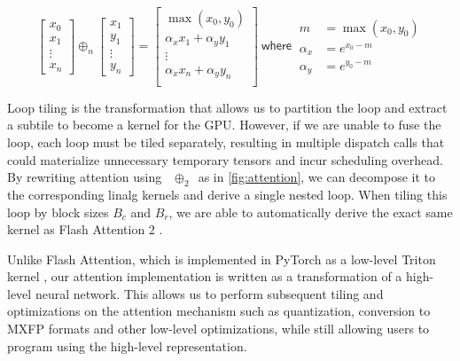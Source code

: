 \documentclass[review, acmsmall, nonacm]{acmart}
\newcommand{\milakov}{~$\oplus_2$~}
\begin{document}
\begin{equation}
  \label{eqn:milakovreduction}
  \begin{bmatrix} x_0 \\ x_1 \\ \vdots \\ x_n  \end{bmatrix} 
  \oplus_n 
  \begin{bmatrix} x_1  \\ y_1 \\ \vdots \\ y_n \end{bmatrix} 
  = 
  \begin{bmatrix}
    \max(x_0, y_0) \\
    \alpha_x  x_1 + \alpha_y y_1 \\ 
    \vdots \\
    \alpha_x x_n +  \alpha_y y_n \\
  \end{bmatrix}
  ~\mathsf{where}~
  \begin{aligned}
    m &= \max(x_0, y_0) \\ 
  \alpha_x &= e^{x_0 - m} \\
  \alpha_y &= e^{y_0 - m}
  \end{aligned}
\end{equation}

Loop tiling is the transformation that allows us to partition the loop and extract a subtile to become a kernel for the GPU. However, if we are unable to fuse the loop, each loop must be tiled separately, resulting in multiple dispatch calls that could materialize unnecessary temporary tensors and incur scheduling overhead. By rewriting attention using \milakov as in \autoref{fig:attention}, we can decompose it to the corresponding linalg kernels and derive a single nested loop. When tiling this loop by block sizes $B_c$ and $B_r$, we are able to automatically derive the exact same kernel as Flash Attention 2 \cite{daoFlashAttention2FasterAttention2023}.

Unlike Flash Attention, which is implemented in PyTorch as a low-level Triton kernel \cite{pytorchcontributorsTorchnnfunctionalscaled_dot_product_attentionPyTorch272025}, our attention implementation is written as a transformation of a high-level neural network. This allows us to perform subsequent tiling and optimizations on the attention mechanism such as quantization, conversion to MXFP \cite{rouhaniMicroscalingDataFormats2023} formats and other low-level optimizations, while still allowing users to program using the high-level representation.
\end{document}
